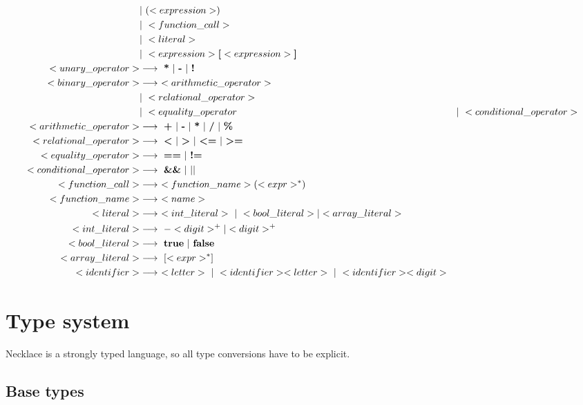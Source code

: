 \documentclass{article}
\begin{document}
\begin{align*}
    &| \ ( <expression> ) \\
    &| \ <function\_call> \\
    &| \ <literal> \\
    &| \ <expression> \textbf{[} <expression> \textbf{]} \\
<unary\_operator> &\longrightarrow \ \textbf{*} \ | \ \textbf{-} \ | \ \textbf{!} \\
<binary\_operator> &\longrightarrow \ <arithmetic\_operator> \\ 
    &| \ <relational\_operator> \\
    &| \ <equality\_operator
    &| \ <conditional\_operator> \\
<arithmetic\_operator> &\longrightarrow \ \textbf{+} \
    | \ \textbf{-} \
    | \ \textbf{*} \
    | \ \textbf{/} \
    | \ \textbf{\%} \\
<relational\_operator> &\longrightarrow \ \textbf{\textless} \
    | \ \textbf{\textgreater} \
    | \ \textbf{\textless=} \
    | \ \textbf{\textgreater=} \\
<equality\_operator> &\longrightarrow \ \textbf{==} \ | \ \textbf{!=} \\
<conditional\_operator> &\longrightarrow \ \textbf{\&\&} \ | \ \textbf{$\mid\mid$} \\
<function\_call> &\longrightarrow \ <function\_name> ( <expr>^* ) \\
<function\_name> &\longrightarrow \ <name> \\
<literal> &\longrightarrow \ <int\_literal> \ | \ <bool\_literal> | <array\_literal> \\
<int\_literal> &\longrightarrow \ - <digit>^+|<digit>^+ \\
<bool\_literal> &\longrightarrow \ \textbf{true} \ | \ \textbf{false} \\
<array\_literal> &\longrightarrow \ [<expr>^*] \\
<identifier> &\longrightarrow \ <letter> \ | \ <identifier> <letter> \ | \ <identifier><digit> \\
\end{align*}

\section{Type system}
Necklace is a strongly typed language, so all type conversions have to be explicit.
\subsection{Base types}
\end{document}
